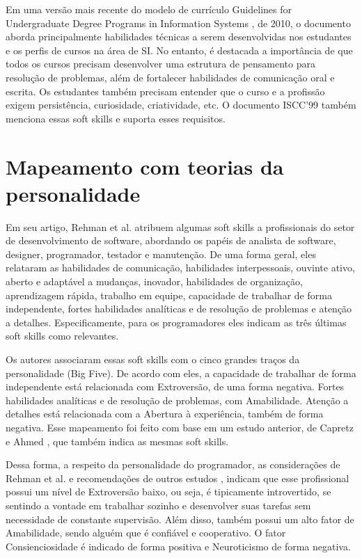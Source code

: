 Em uma versão mais recente do modelo de currículo Guidelines for Undergraduate Degree Programs in Information Systems \cite{is10}, de 2010, o documento aborda principalmente habilidades técnicas a serem desenvolvidas nos estudantes e os perfis de cursos na área de SI. No entanto, é destacada a importância de que todos os cursos precisam desenvolver uma estrutura de pensamento para resolução de problemas, além de fortalecer habilidades de comunicação oral e escrita. Os estudantes também precisam entender que o curso e a profissão exigem persistência, curiosidade, criatividade, etc. O documento ISCC'99 também menciona essas soft skills e suporta esses requisitos.

\section{Mapeamento com teorias da personalidade}
\label{sec:mapeamento}

Em seu artigo, Rehman et al. \cite{rehman:12} atribuem algumas soft skills a profissionais do setor de desenvolvimento de software, abordando os papéis de analista de software, designer, programador, testador e manutenção. De uma forma geral, eles relataram as habilidades de comunicação, habilidades interpessoais, ouvinte ativo, aberto e adaptável a mudanças, inovador, habilidades de organização, aprendizagem rápida, trabalho em equipe, capacidade de trabalhar de forma independente, fortes habilidades analíticas e de resolução de problemas e atenção a detalhes. Especificamente, para os programadores eles indicam as três últimas soft skills como relevantes.

Os autores associaram essas soft skills com o cinco grandes traços da personalidade (Big Five). De acordo com eles, a capacidade de trabalhar de forma independente está relacionada com Extroversão, de uma forma negativa. Fortes habilidades analíticas e de resolução de problemas, com Amabilidade. Atenção a detalhes está relacionada com a Abertura à experiência, também de forma negativa. Esse mapeamento foi feito com base em um estudo anterior, de Capretz e Ahmed \cite{capretz:10}, que também indica as mesmas soft skills.

Dessa forma, a respeito da personalidade do programador, as considerações de Rehman et al. \cite{rehman:12} e recomendações de outros estudos \cite{sodiya:07} \cite{martinez:11}, indicam que esse profissional possui um nível de Extroversão baixo, ou seja, é tipicamente introvertido, se sentindo a vontade em trabalhar sozinho e desenvolver suas tarefas sem necessidade de constante supervisão. Além disso, também possui um alto fator de Amabilidade, sendo alguém que é confiável e cooperativo. O fator Consienciosidade é indicado de forma positiva e Neuroticismo de forma negativa.

